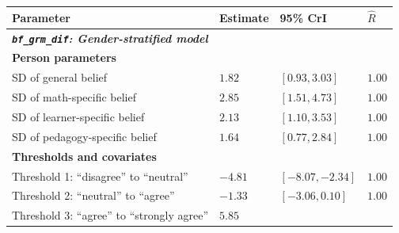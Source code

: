 \documentclass[
  man,
  floatsintext,
  longtable,
  nolmodern,
  notxfonts,
  notimes,
  colorlinks=true,linkcolor=blue,citecolor=blue,urlcolor=blue]{apa7}
\begin{document}
\begin{table}

{\caption{{Population-level parameter estimates from the two DIF models.
Person parameter SDs are reported for the bi-factor structure.
Thresholds are intercepts on the cumulative logit scale. Covariate
effects are log-odds differences relative to the baseline category
(female; District 1).}{\label{tbl-dif-summary}}}
\vspace{-20pt}}

\begin{longtable}[]{@{}
  >{\raggedright\arraybackslash}p{}
  >{\raggedright\arraybackslash}p{}
  >{\raggedright\arraybackslash}p{}
  >{\raggedright\arraybackslash}p{}@{}}
\toprule\noalign{}
\begin{minipage}[b]{\linewidth}\raggedright
Parameter
\end{minipage} & \begin{minipage}[b]{\linewidth}\raggedright
Estimate
\end{minipage} & \begin{minipage}[b]{\linewidth}\raggedright
95\% CrI
\end{minipage} & \begin{minipage}[b]{\linewidth}\raggedright
\(\hat{R}\)
\end{minipage} \\
\midrule\noalign{}
\endhead
\bottomrule\noalign{}
\endlastfoot
\textbf{\emph{\texttt{bf\_grm\_dif}: Gender-stratified model}} & & & \\
\textbf{Person parameters} & & & \\
SD of general belief & \(1.82\) & \([0.93, 3.03]\) & \(1.00\) \\
SD of math-specific belief & \(2.85\) & \([1.51, 4.73]\) & \(1.00\) \\
SD of learner-specific belief & \(2.13\) & \([1.10, 3.53]\) &
\(1.00\) \\
SD of pedagogy-specific belief & \(1.64\) & \([0.77, 2.84]\) &
\(1.00\) \\
\textbf{Thresholds and covariates} & & & \\
Threshold 1: ``disagree'' to ``neutral'' & \(-4.81\) &
\([-8.07, -2.34]\) & \(1.00\) \\
Threshold 2: ``neutral'' to ``agree'' & \(-1.33\) & \([-3.06, 0.10]\) &
\(1.00\) \\
Threshold 3: ``agree'' to ``strongly agree'' & \(5.85\) &

\end{longtable}
\end{table}
\end{document}
